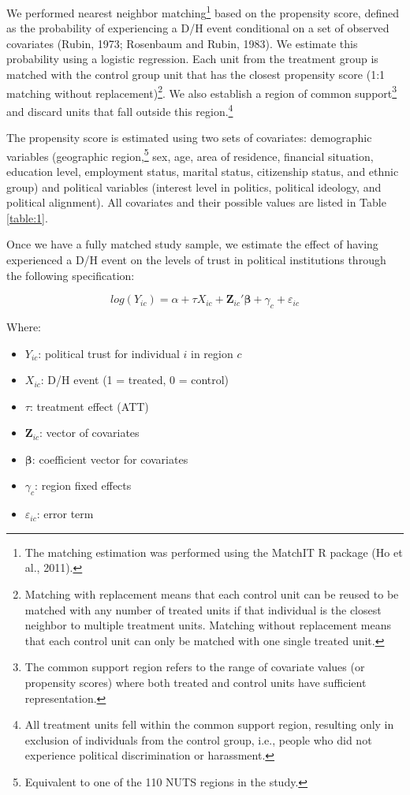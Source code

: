 \documentclass{article}
\begin{document}
We performed nearest neighbor matching\footnote{The matching estimation was performed using the MatchIT R package (Ho et al., 2011).} based on the propensity score, defined as the probability of experiencing a D/H event conditional on a set of observed covariates (Rubin, 1973; Rosenbaum and Rubin, 1983). We estimate this probability using a logistic regression. Each unit from the treatment group is matched with the control group unit that has the closest propensity score (1:1 matching without replacement)\footnote{Matching with replacement means that each control unit can be reused to be matched with any number of treated units if that individual is the closest neighbor to multiple treatment units. Matching without replacement means that each control unit can only be matched with one single treated unit.}. We also establish a region of common support\footnote{The common support region refers to the range of covariate values (or propensity scores) where both treated and control units have sufficient representation.} and discard units that fall outside this region.\footnote{All treatment units fell within the common support region, resulting only in exclusion of individuals from the control group, i.e., people who did not experience political discrimination or harassment.}

The propensity score is estimated using two sets of covariates: demographic variables (geographic region,\footnote{Equivalent to one of the 110 NUTS regions in the study.} sex, age, area of residence, financial situation, education level, employment status, marital status, citizenship status, and ethnic group) and political variables (interest level in politics, political ideology, and political alignment). All covariates and their possible values are listed in Table \ref{table:1}.

Once we have a fully matched study sample, we estimate the effect of having experienced a D/H event on the levels of trust in political institutions through the following specification:

\begin{equation}
\label{eq:1}
log(Y_{ic}) = \alpha + \tau X_{ic} + \mathbf{Z}_{ic}'\mathbf{\beta} + \gamma_c + \varepsilon_{ic}
\end{equation}

Where:
\begin{itemize}
  \item \( Y_{ic} \): political trust for individual \( i \) in region \( c \)
  \item \( X_{ic} \): D/H event (1 = treated, 0 = control)
  \item \( \tau \): treatment effect (ATT)
  \item \( \mathbf{Z}_{ic} \): vector of covariates
  \item \( \mathbf{\beta} \): coefficient vector for covariates
  \item \( \gamma_c \): region fixed effects
  \item \( \varepsilon_{ic} \): error term
\end{itemize}
\end{document}
